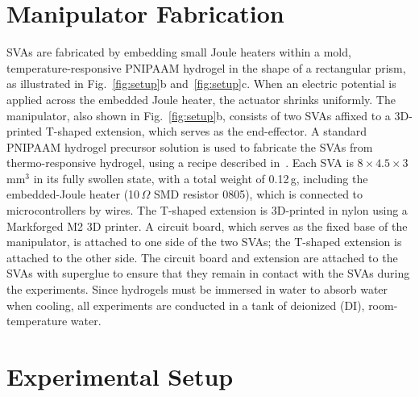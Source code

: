 \section{Manipulator Fabrication}

SVAs are fabricated by embedding small Joule heaters within a mold, temperature-responsive PNIPAAM hydrogel in the shape of a rectangular prism, as illustrated in Fig.~\ref{fig:setup}b and~\ref{fig:setup}c. When an electric potential is applied across the embedded Joule heater, the actuator shrinks uniformly. The manipulator, also shown in Fig.~\ref{fig:setup}b, consists of two SVAs affixed to a 3D-printed T-shaped extension, which serves as the end-effector. A standard PNIPAAM hydrogel precursor solution is used to fabricate the SVAs from thermo-responsive hydrogel, using a recipe described in~\cite{Khodambashi2021}. Each SVA is $8\times4.5\times3$\,mm$^3$ in its fully swollen state, with a total weight of 0.12\,g, including the embedded-Joule heater (10\,$\Omega$ SMD resistor 0805), which is connected to microcontrollers by wires. The T-shaped extension is 3D-printed in nylon using a Markforged M2 3D printer. 
A circuit board, which serves as the fixed base of the manipulator, is attached to one side of the two SVAs; the T-shaped extension is attached to the other side. The circuit board and extension are attached to the SVAs with superglue to ensure that they remain in contact with the SVAs during the experiments. Since hydrogels must be immersed in water to absorb water when cooling, all experiments are conducted in a tank of deionized (DI), room-temperature water.

\section{Experimental Setup}

